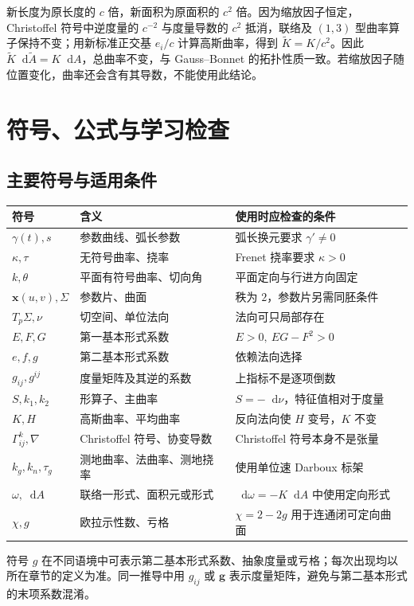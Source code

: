 \documentclass[UTF8,12pt,a4paper,fontset=fandol]{ctexbook}
\newcommand{\dd}{\mathop{}\!\mathrm d}
\begin{document}
\begin{solve}
新长度为原长度的 $c$ 倍，新面积为原面积的 $c^2$ 倍。因为缩放因子恒定，Christoffel 符号中逆度量的 $c^{-2}$ 与度量导数的 $c^2$ 抵消，联络及 $(1,3)$ 型曲率算子保持不变；用新标准正交基 $e_i/c$ 计算高斯曲率，得到 $\widetilde K=K/c^2$。因此 $\widetilde K\dd\widetilde A=K\dd A$，总曲率不变，与 Gauss--Bonnet 的拓扑性质一致。若缩放因子随位置变化，曲率还会含有其导数，不能使用此结论。
\end{solve}

\chapter{符号、公式与学习检查}
\label{app:dg-reference}

\section{主要符号与适用条件}
\begin{longtable}{p{}p{}p{}}
\toprule
符号 & 含义 & 使用时应检查的条件\\
\midrule
\endhead
$\gamma(t),s$ & 参数曲线、弧长参数 & 弧长换元要求 $\gamma'\ne0$\\
$\kappa,\tau$ & 无符号曲率、挠率 & Frenet 挠率要求 $\kappa>0$\\
$k,\theta$ & 平面有符号曲率、切向角 & 平面定向与行进方向固定\\
$\mathbf x(u,v),\Sigma$ & 参数片、曲面 & 秩为 $2$，参数片另需同胚条件\\
$T_p\Sigma,\nu$ & 切空间、单位法向 & 法向可只局部存在\\
$E,F,G$ & 第一基本形式系数 & $E>0,\ EG-F^2>0$\\
$e,f,g$ & 第二基本形式系数 & 依赖法向选择\\
$g_{ij},g^{ij}$ & 度量矩阵及其逆的系数 & 上指标不是逐项倒数\\
$S,k_1,k_2$ & 形算子、主曲率 & $S=-\dd\nu$，特征值相对于度量\\
$K,H$ & 高斯曲率、平均曲率 & 反向法向使 $H$ 变号，$K$ 不变\\
$\Gamma^k_{ij},\nabla$ & Christoffel 符号、协变导数 & Christoffel 符号本身不是张量\\
$k_g,k_n,\tau_g$ & 测地曲率、法曲率、测地挠率 & 使用单位速 Darboux 标架\\
$\omega,\dd A$ & 联络一形式、面积元或形式 & $\dd\omega=-K\dd A$ 中使用定向形式\\
$\chi,g$ & 欧拉示性数、亏格 & $\chi=2-2g$ 用于连通闭可定向曲面\\
\bottomrule
\end{longtable}
符号 $g$ 在不同语境中可表示第二基本形式系数、抽象度量或亏格；每次出现均以所在章节的定义为准。同一推导中用 $g_{ij}$ 或 $\mathbf g$ 表示度量矩阵，避免与第二基本形式的末项系数混淆。
\end{document}

